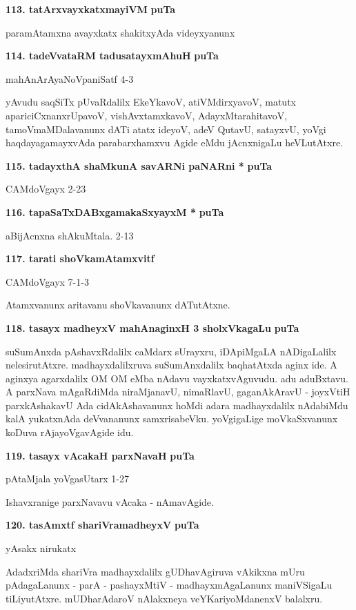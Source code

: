\medskip
\noindent
\textbf{113. tatArxvayxkatxmayiVM} \hfill{\bf puTa }

\smallskip
paramAtamxna avayxkatx shakitxyAda videyxyanunx

\medskip
\noindent
\textbf{114. tadeVvataRM tadusatayxmAhuH} \hfill{\bf puTa }

\hfill{mahAnArAyaNoVpaniSatf 4-3}

\smallskip
yAvudu saqSiTx pUvaRdalilx EkeYkavoV, atiVMdirxyavoV, matutx apariciCxnanxrUpavoV, vishAvxtamxkavoV, AdayxMtarahitavoV, tamoVmaMDalavanunx dATi atatx ideyoV, adeV QutavU, satayxvU, yoVgi haqdayagamayxvAda parabarxhamxvu Agide eMdu jAcnxnigaLu heVLutAtxre.


\medskip
\noindent
\textbf{115. tadayxthA shaMkunA savARNi paNARni *} \hfill{\bf puTa }

\hfill{CAMdoVgayx 2-23}

\medskip
\noindent
\textbf{116. tapaSaTxDABxgamakaSxyayxM *} \hfill{\bf puTa }

\hfill{aBijAcnxna shAkuMtala. 2-13}

\medskip
\noindent
\textbf{117. tarati shoVkamAtamxvitf} \hfill{\bf {}}

\hfill{CAMdoVgayx 7-1-3}

Atamxvanunx aritavanu shoVkavanunx dATutAtxne.

\medskip
\noindent
\textbf{118. tasayx madheyxV mahAnaginxH 3 sholxVkagaLu} \hfill{\bf puTa }

\smallskip
suSumAnxda pAshavxRdalilx caMdarx sUrayxru, iDApiMgaLA nADigaLalilx nelesirutAtxre. madhayxdalilxruva suSumAnxdalilx  baqhatAtxda aginx ide. A aginxya agarxdalilx OM OM eMba nAdavu vayxkatxvAguvudu. adu aduBxtavu. A parxNava mAgaRdiMda niraMjanavU, nimaRlavU, gaganAkAravU - joyxVtiH parxkAshakavU Ada cidAkAshavanunx hoMdi adara madhayxdalilx nAdabiMdu kalA yukatxnAda deVvananunx samxrisabeVku. yoVgigaLige moVkaSxvanunx koDuva rAjayoVgavAgide idu.

\medskip
\noindent
\textbf{119. tasayx vAcakaH parxNavaH} \hfill{\bf puTa }

\hfill{pAtaMjala yoVgasUtarx 1-27}

Ishavxranige parxNavavu vAcaka - nAmavAgide.

\medskip
\noindent
\textbf{120. tasAmxtf shariVramadheyxV} \hfill{\bf puTa }

\hfill{yAsakx nirukatx}

\smallskip
AdadxriMda shariVra madhayxdalilx gUDhavAgiruva vAkikxna mUru pAdagaLanunx - parA - pashayxMtiV - madhayxmAgaLanunx maniVSigaLu tiLiyutAtxre. mUDharAdaroV nAlakxneya veYKariyoMdanenxV balalxru.

